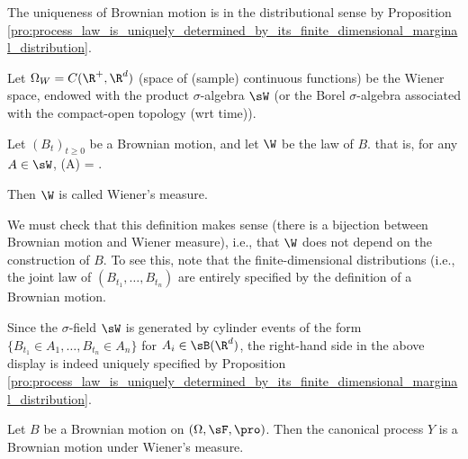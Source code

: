 
The uniqueness of Brownian motion is in the distributional sense by Proposition \ref{pro:process_law_is_uniquely_determined_by_its_finite_dimensional_marginal_distribution}.%

\begin{definition}\label{def:wiener_measure}
Let $\Omega_W = C(\R^+,\R^d)$ (space of (sample) continuous functions) be the Wiener space, endowed with the product $\sigma$-algebra $\sW$ (or the Borel $\sigma$-algebra associated with the compact-open topology (wrt time)).

Let $(B_t)_{t \geq 0}$ be a Brownian motion, and let $\W$ be the law of $B$. that is, for any $A \in \sW$,
\be
\W(A) = \pro{}.
\ee

Then $\W$ is called Wiener's measure.
\end{definition}

\begin{remark}
We must check that this definition makes sense (there is a bijection between Brownian motion and Wiener measure), i.e., that $\W$ does not depend on the construction of $B$. To see this, note that the finite-dimensional distributions (i.e., the joint law of $(B_{t_1} ,\dots,B_{t_n})$ are entirely specified by the definition of a Brownian motion.

Since the $\sigma$-field $\sW$ is generated by cylinder events of the form $\{B_{t_1} \in A_1,\dots,B_{t_n} \in A_n\}$ for $A_i \in \sB(\R^d)$, the right-hand side in the above display is indeed uniquely specified by Proposition \ref{pro:process_law_is_uniquely_determined_by_its_finite_dimensional_marginal_distribution}.
\end{remark}



\begin{proposition}
Let $B$ be a Brownian motion on $(\Omega,\sF,\pro)$. Then the canonical process $Y$ is a Brownian motion under Wiener's measure.
\end{proposition}

